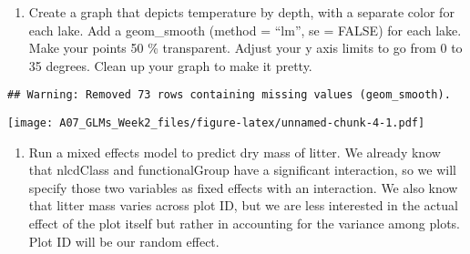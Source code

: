 \documentclass[]{article}
\newenvironment{Shaded}{\begin{snugshade}}{\end{snugshade}}
\newcommand{\CommentTok}[1]{\textcolor[rgb]{0.56,0.35,0.01}{\textit{#1}}}
\newcommand{\DataTypeTok}[1]{\textcolor[rgb]{0.13,0.29,0.53}{#1}}
\newcommand{\DecValTok}[1]{\textcolor[rgb]{0.00,0.00,0.81}{#1}}
\newcommand{\FloatTok}[1]{\textcolor[rgb]{0.00,0.00,0.81}{#1}}
\newcommand{\KeywordTok}[1]{\textcolor[rgb]{0.13,0.29,0.53}{\textbf{#1}}}
\newcommand{\NormalTok}[1]{#1}
\newcommand{\OperatorTok}[1]{\textcolor[rgb]{0.81,0.36,0.00}{\textbf{#1}}}
\newcommand{\OtherTok}[1]{\textcolor[rgb]{0.56,0.35,0.01}{#1}}
\newcommand{\StringTok}[1]{\textcolor[rgb]{0.31,0.60,0.02}{#1}}
\providecommand{\tightlist}{%
  \setlength{\itemsep}{0pt}\setlength{\parskip}{0pt}}
\begin{document}
\begin{enumerate}
\def\labelenumi{\arabic{enumi}.}
\setcounter{enumi}{7}
\tightlist
\item
  Create a graph that depicts temperature by depth, with a separate
  color for each lake. Add a geom\_smooth (method = ``lm'', se = FALSE)
  for each lake. Make your points 50 \% transparent. Adjust your y axis
  limits to go from 0 to 35 degrees. Clean up your graph to make it
  pretty.
\end{enumerate}

\begin{Shaded}
\end{Shaded}

\begin{verbatim}
## Warning: Removed 73 rows containing missing values (geom_smooth).
\end{verbatim}

\texttt{[image: A07\_GLMs\_Week2\_files/figure-latex/unnamed-chunk-4-1.pdf]}

\begin{enumerate}
\def\labelenumi{\arabic{enumi}.}
\setcounter{enumi}{8}
\tightlist
\item
  Run a mixed effects model to predict dry mass of litter. We already
  know that nlcdClass and functionalGroup have a significant
  interaction, so we will specify those two variables as fixed effects
  with an interaction. We also know that litter mass varies across plot
  ID, but we are less interested in the actual effect of the plot itself
  but rather in accounting for the variance among plots. Plot ID will be
  our random effect.
\end{enumerate}
\end{document}
